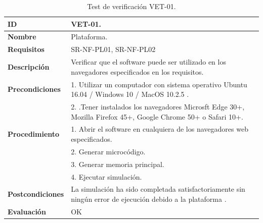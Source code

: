 \begin{center}
\begin{table}[htb]
\centering
\caption{Test de verificación VET-01.}
\begin{tabular}{@{}p{2.5cm} p{13cm}@{}} 
\toprule
\textbf{ID} 					& VET-01. \\
\midrule
\textbf{Nombre} 				& Plataforma. \\
\midrule
\textbf{Requisitos} 		& SR-NF-PL01, SR-NF-PL02\\
\midrule
\textbf{Descripción} 		& Verificar que el software puede ser utilizado en los navegadores especificados en los requisitos. \\
\midrule
\textbf{Precondiciones}		& 1. Utilizar un computador con sistema operativo Ubuntu 16.04 / Windows 10 / MacOS 10.2.5 .\\
							& 2. .Tener instalados los navegadores Microsft Edge 30+, Mozilla Firefox 45+, Google Chrome 50+ o Safari 10+. \\
\midrule
\textbf{Procedimiento}			& 1. Abrir el software en cualquiera de los navegadores web especificados. \\
							& 2. Generar microcódigo.\\
							& 3. Generar memoria principal.\\
							& 4. Ejecutar simulación.\\
\midrule
\textbf{Postcondiciones} 		&  La simulación ha sido completada satisfactoriamente sin ningún error de ejecución debido a la plataforma .\\
\midrule
\textbf{Evaluación} 			& OK \\
\bottomrule
\end{tabular}
\label{tab:vet01}
\end{table}
\end{center}

